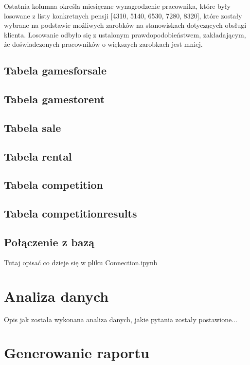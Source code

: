 \documentclass{article}
\begin{document}
		Ostatnia kolumna określa miesięczne wynagrodzenie pracownika, które były losowane z listy konkretnych pensji [4310, 5140, 6530, 7280, 8320], które zostały wybrane na podstawie możliwych zarobków na stanowiskach dotyczących obsługi klienta. Losowanie odbyło się z ustalonym prawdopodobieństwem, zakładającym, że doświadczonych pracowników o większych zarobkach jest mniej.
		
	\subsection{Tabela games\textunderscore for\textunderscore sale}
	
	\subsection{Tabela games\textunderscore to\textunderscore rent}
	
	\subsection{Tabela sale}
	
	\subsection{Tabela rental}
	
	\subsection{Tabela competition}
	
	\subsection{Tabela competition\textunderscore results}
	
	\subsection{Połączenie z bazą}
	Tutaj opisać co dzieje się w pliku Connection.ipynb
	
	
	
	
	\section{Analiza danych}
	
	Opis jak została wykonana analiza danych, jakie pytania zostały postawione...
	
	\section{Generowanie raportu}
	
\end{document}

